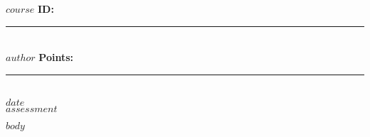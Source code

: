 \documentclass[letterpaper,10pt,twoside]{article}
\begin{document}
\thispagestyle{empty}


\begin{flushleft}
\titlefont\normalsize{$course$} \hfill{\rmfamily\bfseries{ID: }}\rule{2cm}{0.4pt}\\ 
\vspace{.2cm}
\rmfamily\footnotesize{$author$} \hfill{\normalsize\rmfamily\bfseries{Points: }}\rule{2cm}{0.4pt}\\ 
\rmfamily\footnotesize{$date$} \\
\vspace{.6cm}
\titlefont\Large{$assessment$} 
\end{flushleft}
\vspace{.2cm}

\setlength{\columnsep}{5em}
\begin{multicols*}{2}
$body$
\end{multicols*}
\end{document}
